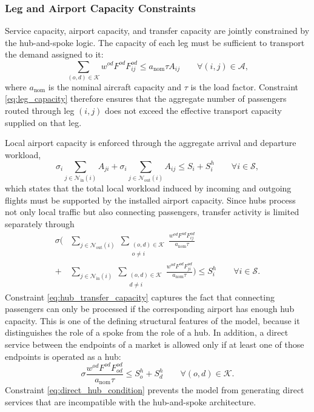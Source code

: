 \subsubsection{Leg and Airport Capacity Constraints}
Service capacity, airport capacity, and transfer capacity are jointly constrained by the hub-and-spoke logic. The capacity of each leg must be sufficient to transport the demand assigned to it:
\begin{equation}
\sum_{(o,d)\in\mathcal{K}} w^{od}F^{od}F_{ij}^{od}
\le a_{\mathrm{nom}}\tau A_{ij}
\qquad \forall (i,j)\in\mathcal{A},
\label{eq:leg_capacity}
\end{equation}
where $a_{\mathrm{nom}}$ is the nominal aircraft capacity and $\tau$ is the load factor. Constraint \eqref{eq:leg_capacity} therefore ensures that the aggregate number of passengers routed through leg $(i,j)$ does not exceed the effective transport capacity supplied on that leg.

Local airport capacity is enforced through the aggregate arrival and departure workload,
\begin{equation}
\sigma_i \sum_{j\in\mathcal{N}_{\mathrm{in}}(i)} A_{ji}
+ \sigma_i \sum_{j\in\mathcal{N}_{\mathrm{out}}(i)} A_{ij}
\le S_i + S_i^h
\qquad \forall i\in\mathcal{S},
\label{eq:airport_capacity_hs}
\end{equation}
which states that the total local workload induced by incoming and outgoing flights must be supported by the installed airport capacity. Since hubs process not only local traffic but also connecting passengers, transfer activity is limited separately through
\begin{align}
\sigma \Bigg(
& \sum_{j\in\mathcal{N}_{\mathrm{out}}(i)} \;
\sum_{\substack{(o,d)\in\mathcal{K}\\ o\neq i}}
\frac{w^{od}F^{od}F_{ij}^{od}}{a_{\mathrm{nom}}\tau}
\nonumber\\
+& \sum_{j\in\mathcal{N}_{\mathrm{in}}(i)} \;
\sum_{\substack{(o,d)\in\mathcal{K}\\ d\neq i}}
\frac{w^{od}F^{od}F_{ji}^{od}}{a_{\mathrm{nom}}\tau}
\Bigg)
\le S_i^h
\qquad \forall i\in\mathcal{S}.
\label{eq:hub_transfer_capacity}
\end{align}
Constraint \eqref{eq:hub_transfer_capacity} captures the fact that connecting passengers can only be processed if the corresponding airport has enough hub capacity. This is one of the defining structural features of the model, because it distinguishes the role of a spoke from the role of a hub. In addition, a direct service between the endpoints of a market is allowed only if at least one of those endpoints is operated as a hub:
\begin{equation}
\sigma \frac{w^{od}F^{od}F_{od}^{od}}{a_{\mathrm{nom}}\tau}
\le S_o^h + S_d^h
\qquad \forall (o,d)\in\mathcal{K}.
\label{eq:direct_hub_condition}
\end{equation}
Constraint \eqref{eq:direct_hub_condition} prevents the model from generating direct services that are incompatible with the hub-and-spoke architecture.

